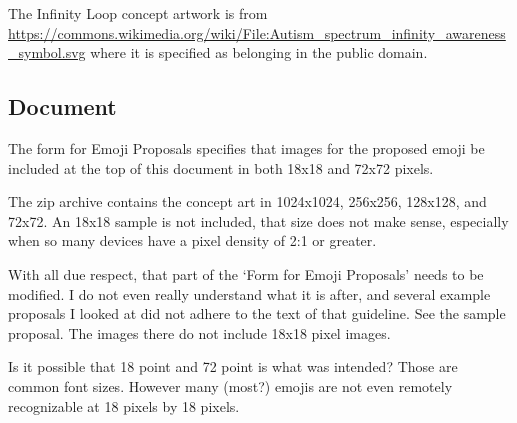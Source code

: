 The Infinity Loop concept artwork is from
\url{https://commons.wikimedia.org/wiki/File:Autism_spectrum_infinity_awareness_symbol.svg}
where it is specified as belonging in the public domain.

\subsection{Document}

The form for Emoji Proposals specifies that images for the proposed emoji be included at
the top of this document in both 18x18 and 72x72 pixels.

The zip archive contains the concept art in 1024x1024, 256x256, 128x128, and 72x72. An 18x18 sample
is not included, that size does not make sense, especially when so many devices have a pixel
density of 2:1 or greater.

With all due respect, that part of the `Form for Emoji Proposals' needs to be modified. I do
not even really understand what it is after, and several example proposals I looked at did
not adhere to the text of that guideline. See the
sample proposal. The images there do not include 18x18 pixel images.

Is it possible that 18 point and 72 point is what was intended? Those are common font sizes.
However many (most?) emojis are not even remotely recognizable at 18 pixels by 18 pixels.

